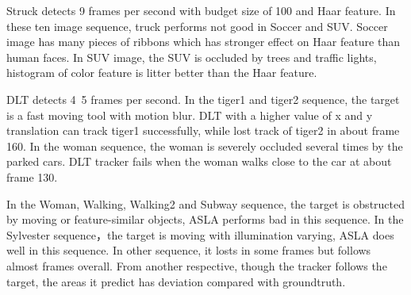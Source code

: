 \documentclass{article}
\begin{document}
Struck detects 9 frames per second with budget size of 100 and Haar feature. In these ten image sequence, truck performs not good in Soccer and SUV. Soccer image has many pieces of ribbons which has stronger effect on Haar feature than human faces. In SUV image, the SUV is occluded by trees and traffic lights, histogram of color feature is litter better than the Haar feature.

DLT detects 4~5 frames per second. In the tiger1 and tiger2 sequence, the target is a fast moving tool with motion blur. DLT with a higher value of x and y translation can track tiger1 successfully, while lost track of tiger2 in about frame 160. In the woman sequence, the woman is severely occluded several times by the parked cars. DLT tracker fails when the woman walks close to the car at about frame 130.

In the Woman, Walking, Walking2 and Subway sequence, the target is obstructed by moving or feature-similar objects, ASLA performs bad in this sequence. In the Sylvester sequence，the target is moving with illumination varying, ASLA does well in this sequence. In other sequence, it losts in some frames but follows almost frames overall. From another respective,  though the tracker follows the target, the areas it predict has deviation compared with  groundtruth.
\end{document}

